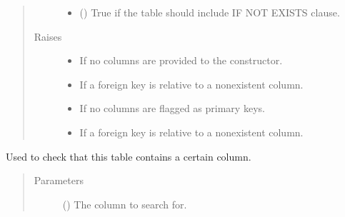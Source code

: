 \documentclass[letterpaper,10pt,english]{sphinxmanual}
\begin{document}
\begin{fulllineitems}
\begin{quote}
\begin{description}
\begin{itemize}
\item {} 
\sphinxAtStartPar
{} (\sphinxstyleliteralemphasis{\sphinxupquote{, }}) \textendash{} True if the table should include IF NOT EXISTS clause.

\end{itemize}

\item[{Raises}] \leavevmode\begin{itemize}
\item {} 
\sphinxAtStartPar
{} \textendash{} If no columns are provided to the constructor.

\item {} 
\sphinxAtStartPar
{} \textendash{} If a foreign key is relative to a non\sphinxhyphen{}existent column.

\item {} 
\sphinxAtStartPar
{} \textendash{} If no columns are flagged as primary keys.

\item {} 
\sphinxAtStartPar
{} \textendash{} If a foreign key is relative to a non\sphinxhyphen{}existent column.

\end{itemize}

\end{description}\end{quote}

\begin{fulllineitems}
\label{\detokenize{model:mini_sql.model.table.Table.contains}}
\sphinxAtStartPar
Used to check that this table contains a certain column.
\begin{quote}\begin{description}
\item[{Parameters}] \leavevmode
\sphinxAtStartPar
{} ({\hyperref[\detokenize{model:mini_sql.model.column.Column}]{}}) \textendash{} The column to search for.


\end{description}
\end{quote}
\end{fulllineitems}
\end{fulllineitems}
\end{document}
